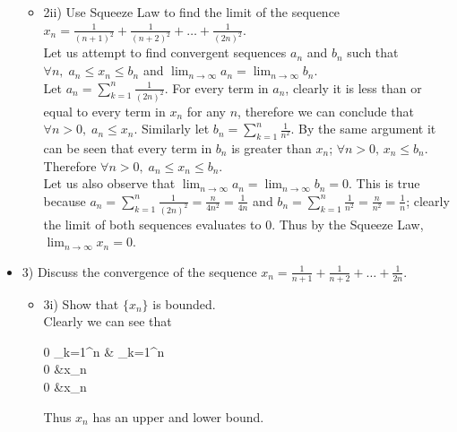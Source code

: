 \documentclass[ 12pt ]{article}
\begin{document}
\begin{itemize}
\begin{itemize}
		\item[] {\large 2ii)}
		Use Squeeze Law to find the limit of the sequence
		$x_n = \frac{1}{(n+1)^2} + \frac{1}{(n+2)^2} + \hdots +\frac{1}{(2n)^2}$. \\
		Let us attempt to find convergent sequences $a_n$ and $b_n$ such that
		$\forall n,\; a_n \leq x_n \leq b_n$ and
		$\lim_{n \rightarrow \infty}a_n=\lim_{n \rightarrow \infty}b_n$. \\
		Let $a_n=\sum_{k=1}^n \frac{1}{(2n)^2}$. For every term in $a_n$, clearly it is less
		than or equal to every term in $x_n$ for any $n$, therefore we can conclude that
		$\forall n>0,\; a_n \leq x_n$. Similarly let $b_n = \sum_{k=1}^n \frac{1}{n^2}$.
		By the same argument it can be seen that every term in $b_n$
		is greater than $x_n$; $\forall n>0,\, x_n \leq b_n$. Therefore
		$\forall n>0,\; a_n \leq x_n \leq b_n$. \\
		Let us also observe that $\lim_{n \rightarrow \infty} a_n = \lim_{n \rightarrow \infty} b_n = 0$.
		This is true because $a_n=\sum_{k=1}^n \frac{1}{(2n)^2} = \frac{n}{4n^2} = \frac{1}{4n}$ and
		$b_n = \sum_{k=1}^n \frac{1}{n^2}=\frac{n}{n^2}=\frac{1}{n}$; clearly the limit of both
		sequences evaluates to 0. Thus by the Squeeze Law, $\lim_{n \rightarrow \infty} x_n = 0$.
	\end{itemize}

	\item[] {\large 3)}
	Discuss the convergence of the sequence $x_n = \frac{1}{n+1} + \frac{1}{n+2} + \hdots + \frac{1}{2n}$.
	\begin{itemize}
		\item[] {\large 3i)}
		Show that $\{x_n\}$ is bounded. \\
		Clearly we can see that
		\begin{flalign}
			0 \leq \sum_{k=1}^n & \leq \sum_{k=1}^n  \nonumber \\
			0 \leq &x_n \leq {} \nonumber \\
			0 \leq &x_n  \nonumber
		\end{flalign}
		Thus $x_n$ has an upper and lower bound.
		\newpage


\end{itemize}
\end{itemize}
\end{document}
